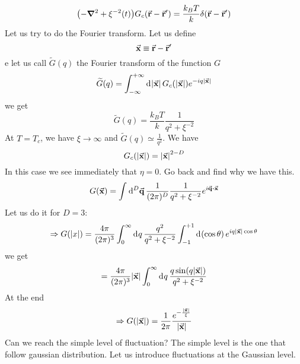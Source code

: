 \documentclass[../main/main.tex]{subfiles}
\begin{document}

\begin{equation}
  \qty(- \grad ^2 + \xi ^{-2} (t)) G_c (\va{r}-\va{r}') = \frac{k_B T}{k} \delta (\va{r}-\va{r}')
\end{equation}
Let us try to do the Fourier transform.
Let us define
\begin{equation}
  \va{x} \equiv \va{r} - \va{r}'
\end{equation}
e let us call \( \widetilde{G} (q)  \) the Fourier transform of the function \( G \)
\begin{equation}
  \widetilde{G} (q) = \int_{- \infty }^{+ \infty } \dd[]{\abs{\va{x}} } G_c ( \abs{\va{x}} ) e^{- i q \abs{\va{x}} }
\end{equation}
we get
\begin{equation}
  \widetilde{G} ( q ) = \frac{k_B T}{k} \frac{1}{q^2 + \xi ^{-2}}
\end{equation}
At \( T = T_c \), we have  \( \xi \rightarrow \infty  \)  and \( \widetilde{G} (q) \simeq \frac{1}{q^2}  \).
We have
\begin{equation}
  G_c (\abs{\va{x}} ) = \abs{\va{x}}^{2-D}
\end{equation}
In this case we see immediately that \( \eta = 0 \). Go back and find why we have this.
\begin{equation}
  G (\va{x}) = \int_{}^{} \dd[D]{\va{q}}  \frac{1}{(2 \pi )^D} \frac{1}{q^2 + \xi ^{-2}} e^{i \va{q} \vdot \va{x}}
\end{equation}
Let us do it for \( D=3 \):
\begin{equation}
  \Rightarrow G(\abs{x} ) = \frac{4 \pi }{ (2 \pi )^3} \int_{0}^{\infty } \dd[]{q} \frac{q^2}{q^2+ \xi ^{-2}} \int_{-1}^{+1} \dd[]{(\cos \theta  )}    e^{i q \abs{\va{x}} \cos \theta  }
\end{equation}
we get
\begin{equation}
  = \frac{4 \pi }{ (2 \pi )^3} \abs{\va{x}} \int_{0}^{\infty } \dd[]{q} \frac{q \sin(q \abs{\va{x}} ) }{q^2 + \xi ^{-2}}
\end{equation}
At the end
\begin{equation}
  \Rightarrow G ( \abs{\va{x}} ) = \frac{1}{2 \pi } \frac{e^{- \frac{\abs{\va{x}} }{\xi }} }{\abs{\va{x}} }
\end{equation}
Can we reach the simple level of fluctuation? The simple level is the one that follow gaussian distribution.
Let us introduce fluctuations at the Gaussian level.
\end{document}
